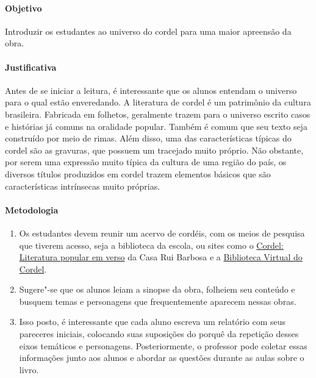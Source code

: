 \documentclass[12pt]{extarticle}
\begin{document}
\paragraph{Objetivo} Introduzir os estudantes ao universo do cordel para uma
maior apreensão da obra.

\paragraph{Justificativa} Antes de se iniciar a leitura, é interessante que os
alunos entendam o universo para o qual estão enveredando. A literatura de
cordel é um patrimônio da cultura brasileira. Fabricada em folhetos, geralmente
trazem para o universo escrito casos e histórias já comuns na oralidade
popular. Também é comum que seu texto seja construído por meio de rimas. Além
disso, uma das características típicas do cordel são as gravuras, que possuem
um tracejado muito próprio. Não obstante, por serem uma expressão muito típica
da cultura de uma região do país, os diversos títulos produzidos em cordel
trazem elementos básicos que são características intrínsecas muito próprias.

\paragraph{Metodologia}

\begin{enumerate}

\item Os estudantes devem reunir um acervo de cordéis, com os meios de pesquisa
  que tiverem acesso, seja a biblioteca da escola, ou sites como
  o \href{http://www.casaruibarbosa.gov.br/cordel/acervo.html}{Cordel: Literatura popular em verso} 
  da Casa Rui Barbosa
  e a \href{http://cordel.edel.univ-poitiers.fr}{Biblioteca Virtual do Cordel}.

\item Sugere"-se que os alunos leiam a sinopse da obra, folheiem seu conteúdo
  e busquem temas e personagens que frequentemente aparecem nessas obras. 

\item Isso posto, é interessante que cada aluno escreva um relatório com seus
  pareceres iniciais, colocando suas suposições do porquê da repetição desses
  eixos temáticos e personagens. Posteriormente, o professor pode coletar essas
  informações junto aos alunos e abordar as questões durante as aulas sobre
  o livro.

\end{enumerate}
\end{document}
